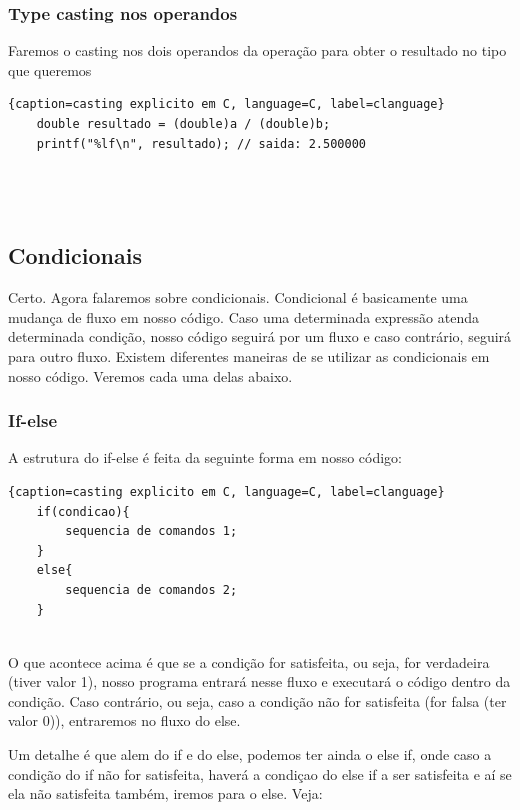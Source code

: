 \documentclass{report}
\begin{document}
	\subsubsection{Type casting nos operandos}
	Faremos o casting nos dois operandos da operação para obter o resultado no tipo que queremos
	
	\begin{center}
		
		\begin{lstlisting}{caption=casting explicito em C, language=C, label=clanguage}
	double resultado = (double)a / (double)b;
	printf("%lf\n", resultado); // saida: 2.500000

			
			
		\end{lstlisting}
	\end{center}
	
	\subsection{Condicionais}
	Certo. Agora falaremos sobre condicionais. Condicional é basicamente uma mudança de fluxo em nosso código. Caso uma determinada expressão atenda determinada condição, nosso código seguirá por um fluxo e caso contrário, seguirá para outro fluxo. Existem diferentes maneiras de se utilizar as condicionais em nosso código. Veremos cada uma delas abaixo.
	\subsubsection{If-else}
	A estrutura do if-else é feita da seguinte forma em nosso código:
	
	\begin{center}
		
		\begin{lstlisting}{caption=casting explicito em C, language=C, label=clanguage}
	if(condicao){
		sequencia de comandos 1;
	}
	else{
		sequencia de comandos 2;
	}
			
		\end{lstlisting}
	\end{center}
	
	
	O que acontece acima é que se a condição for satisfeita, ou seja, for verdadeira (tiver valor 1), nosso programa entrará nesse fluxo e executará o código dentro da condição. Caso contrário, ou seja, caso a condição não for satisfeita (for falsa (ter valor 0)), entraremos no fluxo do else.
	
	Um detalhe é que alem do if e do else, podemos ter ainda o else if, onde caso a condição do if não for satisfeita, haverá a condiçao do else if a ser satisfeita e aí se ela não satisfeita também, iremos para o else. Veja:
	
\end{document}
